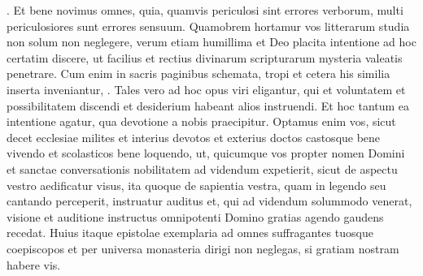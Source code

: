\documentclass[12pt]{article}
\begin{document}
{		. Et bene novimus omnes, quia, quamvis periculosi sint errores verborum, multi periculosiores sunt errores sensuum.
		\pend
		\pstart
		Quamobrem hortamur vos litterarum studia non solum non neglegere, verum etiam humillima et Deo placita intentione ad hoc certatim discere, ut facilius et rectius divinarum scripturarum mysteria valeatis penetrare. Cum enim in sacris paginibus schemata, tropi et cetera his similia inserta inveniantur, . Tales vero ad hoc opus viri eligantur, qui et voluntatem et possibilitatem discendi et desiderium habeant alios instruendi. Et hoc tantum ea intentione agatur, qua devotione a nobis praecipitur. Optamus enim vos, sicut decet ecclesiae milites et interius devotos et exterius doctos castosque bene vivendo et scolasticos bene loquendo, ut, quicumque vos propter nomen Domini et sanctae conversationis nobilitatem ad videndum expetierit, sicut de aspectu vestro aedificatur visus, ita quoque de sapientia vestra, quam in legendo seu cantando perceperit, instruatur auditus et, qui ad videndum solummodo venerat, visione et auditione instructus omnipotenti Domino gratias agendo gaudens recedat.
		\pend
		\pstart
		Huius itaque epistolae exemplaria ad omnes suffragantes tuosque coepiscopos et per universa monasteria dirigi non neglegas, si gratiam nostram habere vis.
		\pend
		\endnumbering
		
		\clearpage
}
\end{document}
